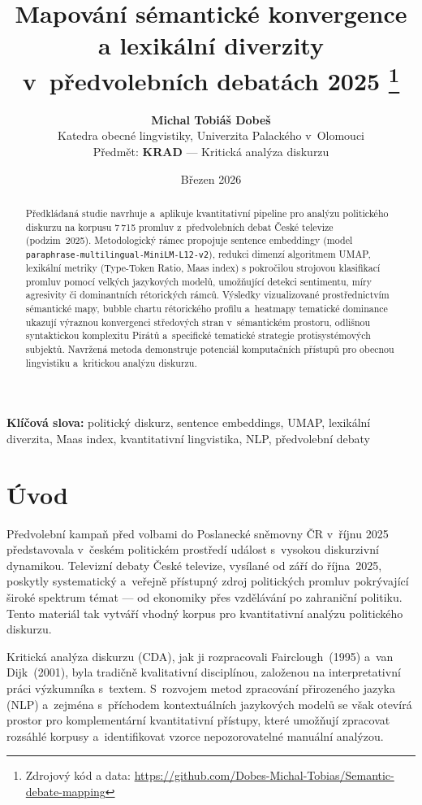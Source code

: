 \documentclass[12pt, a4paper]{article}
\title{%
  \textbf{Mapování sémantické konvergence a lexikální diverzity\\ v~předvolebních debatách 2025}%
  \thanks{Zdrojový kód a data: \url{https://github.com/Dobes-Michal-Tobias/Semantic-debate-mapping}}%
}
\author{%
  \textbf{Michal Tobiáš Dobeš} \\[1ex]
  {\normalsize Katedra obecné lingvistiky, Univerzita Palackého v~Olomouci} \\
  {\small Předmět: \textbf{KRAD} --- Kritická analýza diskurzu}%
}
\date{Březen 2026}{}
\newcommand{\modelname}{\texttt{paraphrase-\allowbreak{}multilingual-\allowbreak{}MiniLM-\allowbreak{}L12-\allowbreak{}v2}}
\begin{document}
\maketitle

\begin{abstract}
Předkládaná studie navrhuje a~aplikuje kvantitativní pipeline pro analýzu
politického diskurzu na korpusu 7\,715 promluv z~předvolebních debat České
televize (podzim~2025). Metodologický rámec propojuje sentence embeddingy
(model \modelname{}), redukci dimenzí
algoritmem UMAP, lexikální metriky (Type-Token Ratio, Maas index) s pokročilou strojovou klasifikací promluv pomocí velkých jazykových modelů, umožňující detekci sentimentu, míry agresivity či dominantních rétorických rámců. Výsledky vizualizované prostřednictvím sémantické mapy,
bubble chartu rétorického profilu a~heatmapy tematické dominance ukazují
výraznou konvergenci středových stran v~sémantickém prostoru, odlišnou
syntaktickou komplexitu Pirátů a~specifické tematické strategie
protisystémových subjektů. Navržená metoda demonstruje potenciál komputačních
přístupů pro obecnou lingvistiku a~kritickou analýzu diskurzu.
\end{abstract}

\bigskip
\noindent\textbf{Klíčová slova:}
politický diskurz, sentence embeddings, UMAP, lexikální diverzita,
Maas index, kvantitativní lingvistika, NLP, předvolební debaty

\newpage
\tableofcontents
\newpage

\section{Úvod}
\label{sec:uvod}

Předvolební kampaň před volbami do Poslanecké sněmovny ČR v~říjnu 2025 představovala
v~českém politickém prostředí událost s~vysokou diskurzivní dynamikou.
Televizní debaty České televize, vysílané od září do října~2025, poskytly
systematický a~veřejně přístupný zdroj politických promluv pokrývající
široké spektrum témat — od ekonomiky přes vzdělávání po zahraniční politiku.
Tento materiál tak vytváří vhodný korpus pro kvantitativní analýzu
politického diskurzu.

Kritická analýza diskurzu (CDA), jak ji rozpracovali
Fairclough~(1995) a~van Dijk~(2001), byla tradičně kvalitativní
disciplínou, založenou na interpretativní práci výzkumníka s~textem.
S~rozvojem metod zpracování přirozeného jazyka (NLP) a~zejména
s~příchodem kontextuálních jazykových modelů se však otevírá prostor
pro komplementární kvantitativní přístupy, které umožňují zpracovat
rozsáhlé korpusy a~identifikovat vzorce nepozorovatelné manuální
analýzou.
\end{document}
